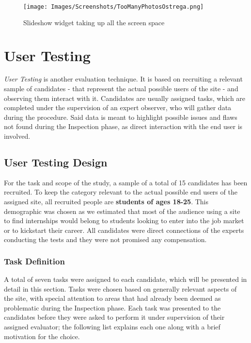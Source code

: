 \documentclass[11pt]{article} %
\begin{document}
\begin{figure}[H]
  \centering
  \texttt{[image: Images/Screenshots/TooManyPhotosOstrega.png]}
  \caption{Slideshow widget taking up all the screen space}
\end{figure}

\newpage

\section{User Testing}
\textit{User Testing} is another evaluation technique. It is based on recruiting a relevant sample of candidates - that represent the actual possible users of the site - and observing them interact with it. Candidates are usually assigned tasks, which are completed under the supervision of an expert observer, who will gather data during the procedure. Said data is meant to highlight possible issues and flaws not found during the Inspection phase, as direct interaction with the end user is involved. 

\subsection{User Testing Design}
For the task and scope of the study, a sample of a total of 15 candidates has been recruited. To keep the category relevant to the actual possible end users of the assigned site, all recruited people are \textbf{students of ages 18-25}. This demographic was chosen as we estimated that most of the audience using a site to find internships would belong to students looking to enter into the job market or to kickstart their career. All candidates were direct connections of the experts conducting the tests and they were not promised any compensation.  

\subsubsection{Task Definition}
A total of seven tasks were assigned to each candidate, which will be presented in detail in this section. Tasks were chosen based on generally relevant aspects of the site, with special attention to areas that had already been deemed as problematic during the Inspection phase. 
Each task was presented to the candidates before they were asked to perform it under supervision of their assigned evaluator; the following list explains each one along with a brief motivation for the choice. 
\end{document}
